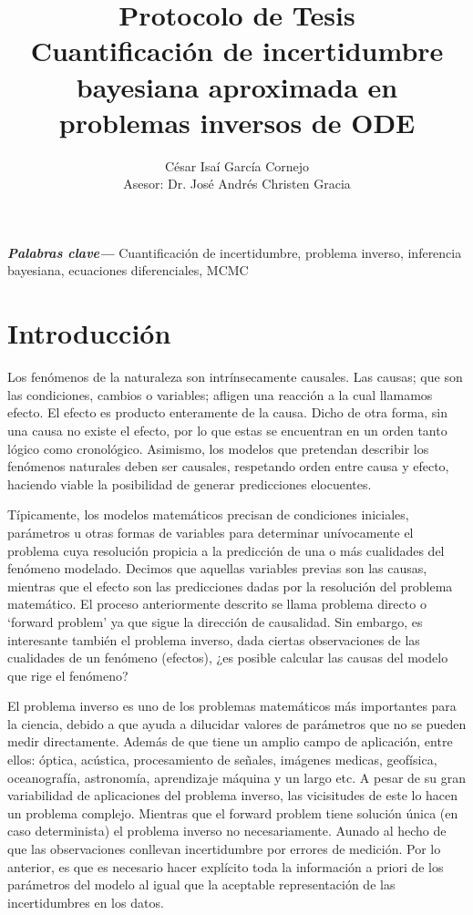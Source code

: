 \documentclass{article}
\title{\textbf{Protocolo de Tesis}\\Cuantificación de incertidumbre bayesiana aproximada en problemas inversos de ODE}
\author{César Isaí García Cornejo \\
Asesor: Dr. José Andrés Christen Gracia}
\providecommand{\keywords}[1]
{
  \small	
  \textbf{\textit{Palabras clave---}} #1
}
\begin{document}
\maketitle

\keywords{Cuantificación de incertidumbre, problema inverso, inferencia bayesiana, ecuaciones diferenciales, MCMC}

\section{Introducción}

Los fenómenos de la naturaleza son intrínsecamente causales. Las causas; que son las condiciones, cambios o variables; afligen una reacción a la cual llamamos efecto. El efecto es producto enteramente de la causa. Dicho de otra forma, sin una causa no existe el efecto, por lo que estas se encuentran en un orden tanto lógico como cronológico. Asimismo, los modelos que pretendan describir los fenómenos naturales deben ser causales, respetando orden entre causa y efecto, haciendo viable la posibilidad de generar predicciones elocuentes. 

Típicamente, los modelos matemáticos precisan de condiciones iniciales, parámetros u otras formas de variables para determinar unívocamente el problema cuya resolución propicia a la predicción de una o más cualidades del fenómeno modelado. Decimos que aquellas variables previas son las causas, mientras que el efecto son las predicciones dadas por la resolución del problema matemático.
El proceso anteriormente descrito se llama problema directo o `forward problem' ya que sigue la dirección de causalidad. Sin embargo, es interesante también el problema inverso, dada ciertas observaciones de las cualidades de un fenómeno (efectos), ¿es posible calcular las causas del modelo que rige el fenómeno?

El problema inverso es uno de los problemas matemáticos más importantes para la ciencia, debido a que ayuda a dilucidar valores de parámetros que no se pueden medir directamente. Además de que tiene un amplio campo de aplicación, entre ellos: óptica, acústica, procesamiento de señales, imágenes medicas, geofísica, oceanografía, astronomía, aprendizaje máquina y un largo etc. A pesar de su gran variabilidad de aplicaciones del problema inverso, las vicisitudes de este lo hacen un problema complejo. Mientras que el forward problem tiene solución única (en caso determinista) el problema inverso no necesariamente. Aunado al hecho de que las observaciones conllevan incertidumbre por errores de medición. Por lo anterior, es que es necesario hacer explícito toda la información a priori de los parámetros del modelo al igual que la aceptable representación de las incertidumbres en los datos.
\end{document}

